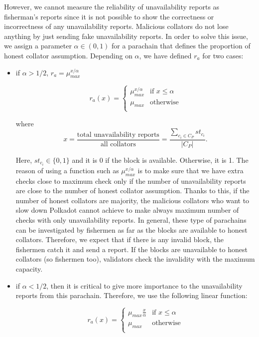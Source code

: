 However, we cannot measure the reliability of unavailability reports as fisherman's reports since it is not possible to show the correctness or incorrectness of any unavailability reports. Malicious collators do not lose anything by just sending fake unavailability reports. In order to solve this issue, we assign a parameter $\alpha \in (0,1)$ for a parachain that defines the proportion of honest collator assumption. Depending on $\alpha$, we have defined $r_a$ for two cases:
\begin{itemize}
    \item if $\alpha > 1/2$, $r_a = \mu_{max}^{x/\alpha}$ 
    
        \[   
    r_a(x)= 
     \begin{cases}
       \mu_{max}^{x/\alpha} & \text{if } x \leq \alpha \\
       \mu_{max} &\text{otherwise} \\ 
     \end{cases}
\]  
    
    where 
    $$x = \frac{\text{total unavailability reports}}{\text{all collators}} = \frac{\sum_{c_i \in C_P}st_{c_i}}{|C_P|}.$$
    
    Here, $st_{c_i}\in \{0,1\}$ and it is 0 if the block is available. Otherwise, it is 1. The reason of using a function such as $\mu_{max}^{x/\alpha}$ is to make sure that we have extra checks close to maximum check only if the number of unavailability reports are close to the number of honest collator assumption. Thanks to this, if the number of honest collators are majority, the malicious collators who want to slow down Polkadot cannot achieve to make always maximum number of checks with only unavailability reports. In general, these type of parachains can be investigated by fishermen as far as the blocks are available to honest collators. Therefore, we expect that if there is any invalid block, the fishermen catch it and send a report. If the blocks are unavailable to honest collators (so fishermen too), validators check the invalidity with the maximum capacity.  
    
    \item if $\alpha < 1/2$, then it is critical to give more importance to the unavailability reports from this parachain. Therefore, we use the following linear function:
    
    \[   
    r_a(x)= 
     \begin{cases}
       \mu_{max}\frac{x}{\alpha} & \text{if } x \leq \alpha \\
       \mu_{max} &\text{otherwise} \\ 
     \end{cases}
\]  
\end{itemize}

